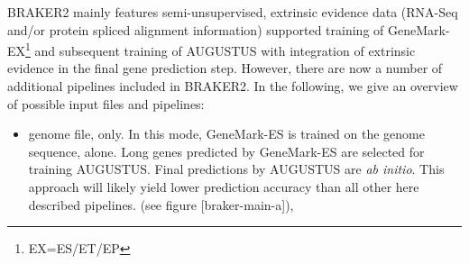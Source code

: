 \documentclass[]{article}
\begin{document}
BRAKER2 mainly features semi-unsupervised, extrinsic evidence data
(RNA-Seq and/or protein spliced alignment information) supported
training of GeneMark-EX\footnote{EX=ES/ET/EP} and subsequent training of
AUGUSTUS with integration of extrinsic evidence in the final gene
prediction step. However, there are now a number of additional pipelines
included in BRAKER2. In the following, we give an overview of possible
input files and pipelines:

\begin{itemize}
\item
  genome file, only. In this mode, GeneMark-ES is trained on the genome
  sequence, alone. Long genes predicted by GeneMark-ES are selected for
  training AUGUSTUS. Final predictions by AUGUSTUS are \emph{ab initio}.
  This approach will likely yield lower prediction accuracy than all
  other here described pipelines. (see figure {[}braker-main-a{]}),


\end{itemize}
\end{document}
